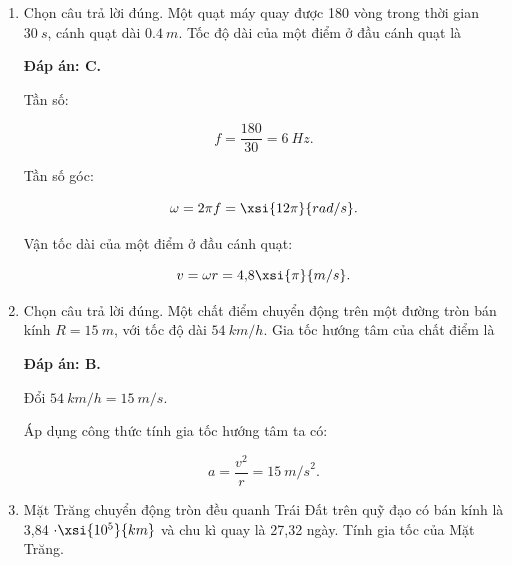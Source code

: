\begin{enumerate}[label=\bfseries Câu \arabic*:,leftmargin=1.5cm]
{}

	\item {}
	
	
	{Chọn câu trả lời đúng. Một quạt máy quay được 180 vòng trong thời gian $\SI{30}{s}$, cánh quạt dài $\SI{0,4}{m}$. Tốc độ dài của một điểm ở đầu cánh quạt là 
	}
	
	\hideall
	{	
		\textbf{Đáp án: C.}
		
		Tần số:
		
		$$f = \dfrac{180}{30} = \SI{6}{Hz}.$$
		
		Tần số góc:
		
		$$\omega = 2\pi f = \xsi{12\pi}{rad/s}.$$
		
		Vận tốc dài của một điểm ở đầu cánh quạt:
		
		$$v = \omega r = \text{4,8}\xsi{\pi}{m/s}.$$
	}
	\item {}
	
	
	{ Chọn câu trả lời đúng. Một chất điểm chuyển động trên một đường tròn bán kính $R = \SI{15}{m}$, với tốc độ dài $\SI{54}{km/h}$. Gia tốc hướng tâm của chất điểm là 
	}
	
	\hideall
	{	
		\textbf{Đáp án: B.}
		
		Đổi $\SI{54}{km/h} = \SI{15}{m/s}.$
		
		Áp dụng công thức tính gia tốc hướng tâm ta có:
		
		$$a = \dfrac{v^2}{r} = \SI{15}{m/s}^2.$$
	}

	
	
	\item {}
	
	
	{Mặt Trăng chuyển động tròn đều quanh Trái Đất trên quỹ đạo có bán kính là 3,84 $\cdot \xsi{10^5}{km}$ và chu kì quay là 27,32 ngày. Tính gia tốc của Mặt Trăng.
	}
	

\end{enumerate}
